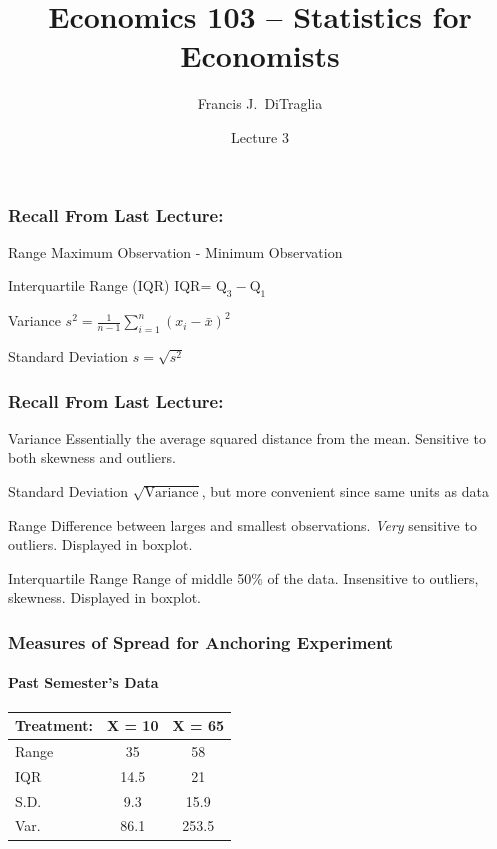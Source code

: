 \documentclass[handout]{beamer}
\title[Econ 103]{Economics 103 -- Statistics for Economists}
\author[F. DiTraglia]{Francis J.\ DiTraglia}
\institute{University of Pennsylvania}
\date{Lecture 3}
\begin{document}
 





\begin{frame}[plain]
	\titlepage 
	

\end{frame} 

\begin{frame}
\frametitle{Recall From Last Lecture: }

\begin{block}{Range}
Maximum Observation - Minimum Observation
\end{block}
\pause
\begin{block}{Interquartile Range (IQR)}
IQR= $\mbox{Q}_3 - \mbox{Q}_1$
\end{block}
\pause
\begin{block}{Variance}
$\displaystyle s^2 = \frac{1}{n-1} \sum_{i=1}^n (x_i - \bar{x})^2$
\end{block}
\pause
 \begin{block}{Standard Deviation}
	$s = \sqrt{s^2}$
\end{block}
\end{frame}

\begin{frame}
\frametitle{Recall From Last Lecture:}
\begin{block}{Variance}
Essentially the average squared distance from the mean. Sensitive to both skewness and outliers.
\end{block}
\pause
\begin{block}{Standard Deviation}
$\sqrt{\mbox{Variance}}$, but more convenient since \alert{same units as data}
\end{block}
\pause
\begin{block}{Range}
Difference between larges and smallest observations. \emph{Very} sensitive to outliers. Displayed in boxplot.
\end{block}
\pause
\begin{block}{Interquartile Range}
Range of middle 50\% of the data. Insensitive to outliers, skewness. Displayed in boxplot.
\end{block}

\end{frame}


\begin{frame}
\frametitle{Measures of Spread for Anchoring Experiment}
\framesubtitle{Past Semester's Data}

\begin{table}
	\begin{tabular}{l|cc}
	Treatment: & X = 10 & X = 65\\
	\hline
		Range&35&58\\
		IQR&14.5&21\\
		S.D.&9.3&15.9\\
		Var.&86.1&253.5
	\end{tabular}
\end{table}
\end{frame}
\end{document}
